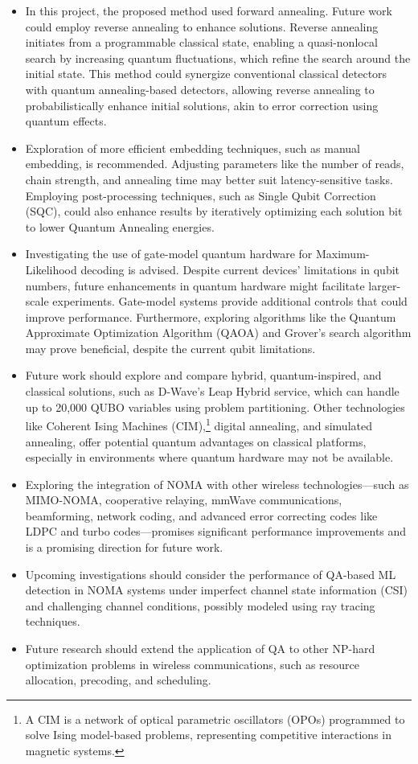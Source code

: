    
    \begin{itemize}
    \item In this project, the proposed method used forward annealing. Future work could employ reverse annealing to enhance solutions. Reverse annealing initiates from a programmable classical state, enabling a quasi-nonlocal search by increasing quantum fluctuations, which refine the search around the initial state. This method could synergize conventional classical detectors with quantum annealing-based detectors, allowing reverse annealing to probabilistically enhance initial solutions, akin to error correction using quantum effects.
    \item Exploration of more efficient embedding techniques, such as manual embedding, is recommended. Adjusting parameters like the number of reads, chain strength, and annealing time may better suit latency-sensitive tasks. Employing post-processing techniques, such as Single Qubit Correction (SQC), could also enhance results by iteratively optimizing each solution bit to lower Quantum Annealing energies.
    \item Investigating the use of gate-model quantum hardware for Maximum-Likelihood decoding is advised. Despite current devices' limitations in qubit numbers, future enhancements in quantum hardware might facilitate larger-scale experiments. Gate-model systems provide additional controls that could improve performance. Furthermore, exploring algorithms like the Quantum Approximate Optimization Algorithm (QAOA) and Grover's search algorithm may prove beneficial, despite the current qubit limitations.
    \item Future work should explore and compare hybrid, quantum-inspired, and classical solutions, such as D-Wave's Leap Hybrid service, which can handle up to 20,000 QUBO variables using problem partitioning. Other technologies like Coherent Ising Machines (CIM),\footnote{A CIM is a network of optical parametric oscillators (OPOs) programmed to solve Ising model-based problems, representing competitive interactions in magnetic systems.} digital annealing, and simulated annealing, offer potential quantum advantages on classical platforms, especially in environments where quantum hardware may not be available.
    \item Exploring the integration of NOMA with other wireless technologies—such as MIMO-NOMA, cooperative relaying, mmWave communications, beamforming, network coding, and advanced error correcting codes like LDPC and turbo codes—promises significant performance improvements and is a promising direction for future work.
    \item Upcoming investigations should consider the performance of QA-based ML detection in NOMA systems under imperfect channel state information (CSI) and challenging channel conditions, possibly modeled using ray tracing techniques.
    \item Future research should extend the application of QA to other NP-hard optimization problems in wireless communications, such as resource allocation, precoding, and scheduling.
\end{itemize}

    
    
    
    
    
    
    
    
    
    
   